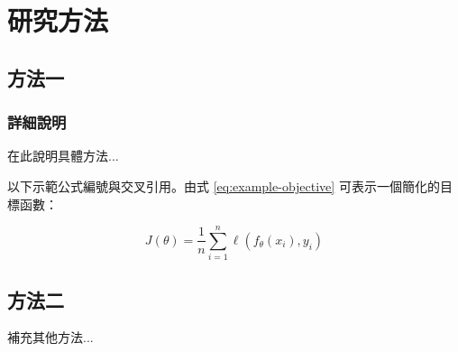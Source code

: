
\chapter{研究方法}

\section{方法一}

\subsection{詳細說明}

在此說明具體方法...

以下示範公式編號與交叉引用。由式 \ref{eq:example-objective} 可表示一個簡化的目標函數：

\begin{equation}
  J(\theta) = \frac{1}{n}\sum_{i=1}^{n}\ell(f_{\theta}(x_i), y_i)
  \label{eq:example-objective}
\end{equation}

\section{方法二}

補充其他方法...
